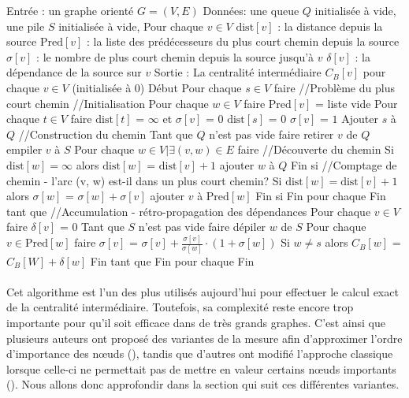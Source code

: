 \documentclass[a4paper, 10pt]{report}
\begin{document}
\begin{algo}
Entrée :
	un graphe orienté $G=(V, E)$
Données:
	une queue $Q$ initialisée à vide,
	une pile $S$ initialisée à vide,
	Pour chaque $v\in V$
		$\text{dist}[v]$ : la distance depuis la source
		$\text{Pred}[v]$ : la liste des prédécesseurs du plus court chemin depuis la source
		$\sigma [v]$ : le nombre de plus court chemin depuis la source jusqu'à $v$
		$\delta [v]$ : la dépendance de la source sur $v$
Sortie :
	La centralité intermédiaire $C_B[v]$ pour chaque $v\in V$ (initialisée à $0$)
Début
	Pour chaque $s\in V$ faire
		//Problème du plus court chemin
			//Initialisation
			Pour chaque $w\in V$ faire $\text{Pred}[v]$ = liste vide
			Pour chaque $t\in V$ faire $\text{dist}[t]$ = $\infty$ et $\sigma [v]$ = $0$
			$\text{dist}[s]$ = $0$
			$\sigma [v]$ = $1$
			Ajouter $s$ à $Q$
			//Construction du chemin
			Tant que $Q$ n'est pas vide faire
				retirer $v$ de $Q$
				empiler $v$ à  $S$
				Pour chaque $w\in V | \exists (v, w)\in E$ faire
					//Découverte du chemin
					Si $\text{dist}[w]=\infty$ alors
						$\text{dist}[w]$ = $\text{dist}[v]+1$
						ajouter $w$ à $Q$
					Fin si
					//Comptage de chemin - l'arc (v, w) est-il dans un plus court chemin?
					Si $\text{dist}[w]=\text{dist}[v]+1$ alors
						$\sigma [w]$ =  $\sigma [w]+\sigma [v]$
						ajouter $v$ à  $\text{Pred}[w]$
					Fin si
				Fin pour chaque
			Fin tant que
		//Accumulation - rétro-propagation des dépendances
			Pour chaque $v\in V$ faire $\delta [v]$ = 0
			Tant que $S$ n'est pas vide faire 
				dépiler $w$ de $S$
				Pour chaque $v\in \text{Pred}[w]$ faire $\sigma [v]$ = $\sigma [v] + \frac{\sigma [v]}{\sigma [w]} \cdot (1+ \sigma [w])$
				Si $w\neq s$ alors $C_B[w]$ = $C_B[W] + \delta [w]$
			Fin tant que
	Fin pour chaque
Fin
\end{algo}

\paragraph{}Cet algorithme est l'un des plus utilisés aujourd'hui pour effectuer le calcul exact de la centralité intermédiaire. Toutefois, sa complexité reste encore trop importante pour qu'il soit efficace dans de très grands graphes. C'est ainsi que plusieurs auteurs ont proposé des variantes de la mesure afin d'approximer l'ordre d'importance des n\oe uds (\cite{Brandes2007Centrality}), tandis que d'autres ont modifié l'approche classique lorsque celle-ci ne permettait pas de mettre en valeur certains n\oe uds importants (\cite{Newman2005MeasureBetweenness}). Nous allons donc approfondir dans la section qui suit ces différentes variantes.
\end{document}
